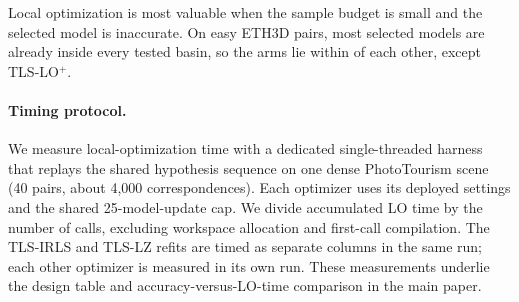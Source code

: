 \documentclass[runningheads]{llncs}
\newcommand{\tlsirls}{TLS-IRLS}
\begin{document}
	Local optimization is most valuable when the sample budget is small and
	the selected model is inaccurate. On easy ETH3D pairs, most selected models are
	already inside every tested basin, so the arms lie within \BudFSpread{} of each other, except TLS-LO$^+$.

	\paragraph{Timing protocol.}
We measure local-optimization time with a dedicated single-threaded harness
that replays the shared hypothesis sequence on one dense PhotoTourism scene
(40 pairs, about 4,000 correspondences). Each optimizer uses its deployed
settings and the shared 25-model-update cap. We divide accumulated LO time by
the number of calls, excluding workspace allocation and first-call
compilation. The \tlsirls{} and TLS-LZ refits are timed as separate columns in the
same run; each other optimizer is measured in its own run. These measurements
underlie the design table and accuracy-versus-LO-time comparison in the main
paper.

\small


\end{document}
